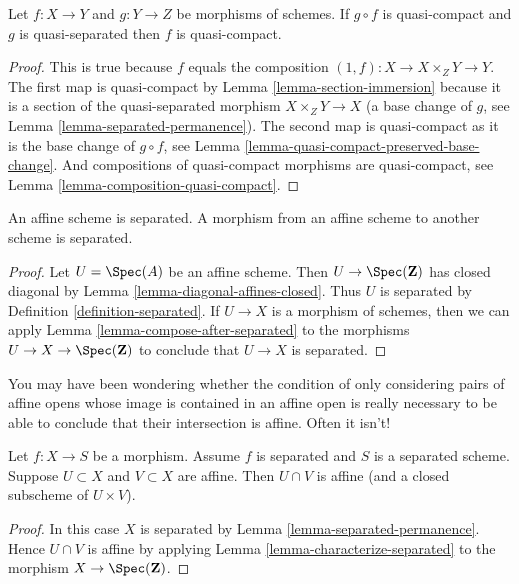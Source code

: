 \begin{lemma}
\label{lemma-quasi-compact-permanence}
Let $f : X \to Y$ and $g : Y \to Z$ be morphisms of schemes.
If $g \circ f$ is quasi-compact and $g$ is quasi-separated
then $f$ is quasi-compact.
\end{lemma}

\begin{proof}
This is true because $f$ equals the composition
$(1, f) : X \to X \times_Z Y \to Y$. The first map
is quasi-compact by Lemma \ref{lemma-section-immersion}
because it is a section of the quasi-separated morphism $X \times_Z Y \to X$
(a base change of $g$, see Lemma \ref{lemma-separated-permanence}).
The second map is quasi-compact as it
is the base change of $g \circ f$, see
Lemma \ref{lemma-quasi-compact-preserved-base-change}.
And compositions of quasi-compact
morphisms are quasi-compact, see Lemma \ref{lemma-composition-quasi-compact}.
\end{proof}

\begin{lemma}
\label{lemma-affine-separated}
An affine scheme is separated. A morphism from an affine scheme
to another scheme is separated.
\end{lemma}

\begin{proof}
Let $U = \Spec(A)$ be an affine scheme. Then $U \to \Spec(\mathbf{Z})$
has closed diagonal by Lemma \ref{lemma-diagonal-affines-closed}.
Thus $U$ is separated by Definition \ref{definition-separated}.
If $U \to X$ is a morphism of schemes, then we can apply
Lemma \ref{lemma-compose-after-separated}
to the morphisms $U \to X \to \Spec(\mathbf{Z})$ to conclude
that $U \to X$ is separated.
\end{proof}

\noindent
You may have been wondering whether the condition
of only considering pairs of affine opens whose image is contained
in an affine open is really necessary to be able to conclude
that their intersection is affine. Often it isn't!

\begin{lemma}
\label{lemma-curiosity}
Let $f : X \to S$ be a morphism.
Assume $f$ is separated and $S$ is a separated scheme.
Suppose $U \subset X$ and $V \subset X$ are affine.
Then $U \cap V$ is affine (and a closed subscheme of $U \times V$).
\end{lemma}

\begin{proof}
In this case $X$ is separated by Lemma \ref{lemma-separated-permanence}.
Hence $U \cap V$ is affine by
applying Lemma \ref{lemma-characterize-separated} to the
morphism $X \to \Spec(\mathbf{Z})$.
\end{proof}

